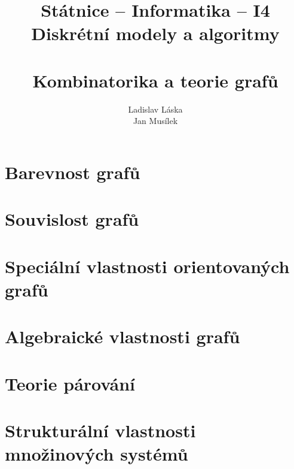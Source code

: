 \documentclass[a4paper,12pt,titlepage]{article}
\title{Státnice -- Informatika -- I4\\ Diskrétní modely a algoritmy\\ ~\\ Kombinatorika a teorie grafů}
\author{Ladislav Láska\\ Jan Musílek}
\begin{document}
\maketitle
\newpage
\tableofcontents
\newpage

\section{Barevnost grafů}



\section{Souvislost grafů}
\section{Speciální vlastnosti orientovaných grafů}
\section{Algebraické vlastnosti grafů}
\section{Teorie párování}





\section{Strukturální vlastnosti množinových systémů}
\end{document}
